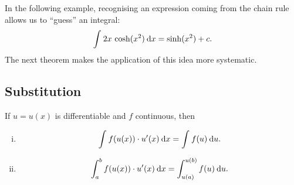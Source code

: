 \begin{remark}
In the following example, recognising an expression coming from the chain rule allows us to ``guess'' an integral:
\[ \int_{}^{} 2x\,\cosh(x^2) \: \mathrm{d} x = \sinh(x^2)+c. \]
The next theorem makes the application of this idea more systematic.
\end{remark}

\subsection{Substitution}

\begin{theorem}[Substitution] 
\label{thm:subst}
If $u=u(x)$ is differentiable and $f$ continuous, then
\begin{enumerate}[(i)]
	\item \[ \int_{}^{} f(u(x)) \cdot u'(x)  \: \mathrm{d} x = \int_{}^{} f(u) \: \mathrm{d} u. \]
	\item \[ \int_{a}^{b} f(u(x)) \cdot u'(x)  \: \mathrm{d} x = \int_{u(a)}^{u(b)} f(u) \: \mathrm{d} u. \]
\end{enumerate}
\end{theorem}

